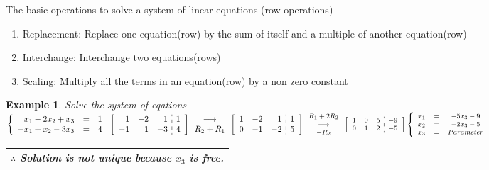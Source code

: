 \documentclass[a4paper,12pt,openany]{book}
\theoremstyle{defn}
\theoremstyle{expl}
\newtheorem{expl}{Example}[section]
\begin{document}
	The basic operations to solve a system of linear equations (row operations)
	\begin{enumerate}
		\item Replacement: Replace one equation(row) by the sum of itself and a multiple of another equation(row)
		\item Interchange: Interchange two equations(rows)
		\item Scaling: Multiply all the terms in an equation(row) by a non zero constant
	\end{enumerate}
	\begin{expl}
		\textup{Solve the system of eqations} 
		$\left\{\begin{array}{rcc}
			x_1-2x_2+x_3&=&1\\
			-x_1+x_2-3x_3&=&4
		\end{array}\right.\\
		\left[\begin{array}{rrr:r}
			1&-2&1&1\\
			-1&1&-3&4\\
		\end{array}\right]
	\begin{array}{c}
		\longrightarrow\\
		 R_2+R_1\\
	\end{array}
	\left[\begin{array}{rrr:r}
		1&-2&1&1\\
		0&-1&-2&5\\
	\end{array}\right]
	\footnotesize{\begin{array}{c}
		R_1+2R_2\\
		\longrightarrow\\
		-R_2\\
	\end{array}}
	\left[\begin{array}{ccc:c}
		1&0&5&-9\\
		0&1&2&-5\\
	\end{array}\right]
	\left\{\begin{array}{rcc}
		x_1&=&-5x_3-9\\
		x_2&=&-2x_3-5\\
		x_3&=&Parameter\\
	\end{array}\right.\\ \hphantom{-} \hspace{5cm}$
	\begin{tabular}{|c|}
		\hline
		$ \therefore$ \textup{Solution is not unique because $x_3$ is free.}\\
		\hline
	\end{tabular}
	\end{expl}
\end{document}
